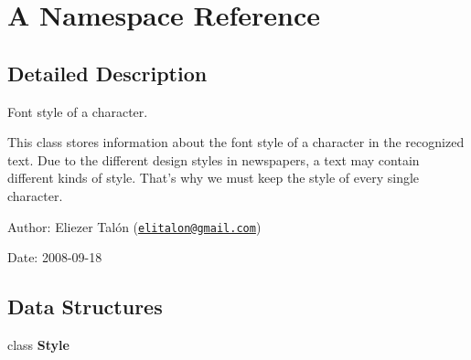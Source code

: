 \hypertarget{namespace_a}{
\section{A Namespace Reference}
\label{namespace_a}
}


\subsection{Detailed Description}
Font style of a character. 

This class stores information about the font style of a character in the recognized text. Due to the different design styles in newspapers, a text may contain different kinds of style. That's why we must keep the style of every single character.

\begin{Desc}
\item[Author:]Eliezer Talón (\href{mailto:elitalon@gmail.com}{\tt elitalon@gmail.com}) \end{Desc}
\begin{Desc}
\item[Date:]2008-09-18 \end{Desc}




\subsection*{Data Structures}
\begin{CompactItemize}
\item 
class \textbf{Style}
\end{CompactItemize}
